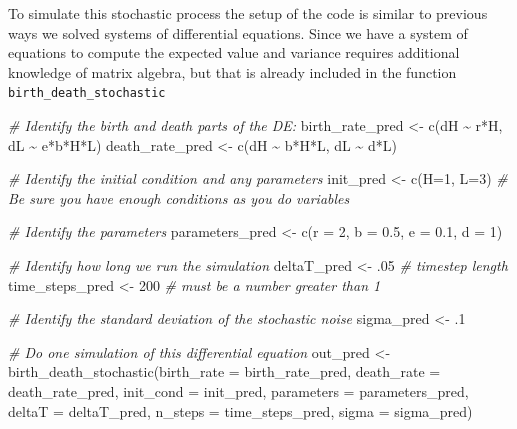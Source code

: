 \documentclass[
]{book}
\newenvironment{Shaded}{\begin{snugshade}}{\end{snugshade}}
\newcommand{\AttributeTok}[1]{\textcolor[rgb]{0.77,0.63,0.00}{#1}}
\newcommand{\CommentTok}[1]{\textcolor[rgb]{0.56,0.35,0.01}{\textit{#1}}}
\newcommand{\DecValTok}[1]{\textcolor[rgb]{0.00,0.00,0.81}{#1}}
\newcommand{\FloatTok}[1]{\textcolor[rgb]{0.00,0.00,0.81}{#1}}
\newcommand{\FunctionTok}[1]{\textcolor[rgb]{0.00,0.00,0.00}{#1}}
\newcommand{\NormalTok}[1]{#1}
\newcommand{\OtherTok}[1]{\textcolor[rgb]{0.56,0.35,0.01}{#1}}
\newcommand{\SpecialCharTok}[1]{\textcolor[rgb]{0.00,0.00,0.00}{#1}}
\theoremstyle{definition}
\theoremstyle{definition}
\theoremstyle{definition}
\theoremstyle{remark}
\begin{document}
To simulate this stochastic process the setup of the code is similar to previous ways we solved systems of differential equations. Since we have a system of equations to compute the expected value and variance requires additional knowledge of matrix algebra, but that is already included in the function \texttt{birth\_death\_stochastic}

\begin{Shaded}
\begin{Highlighting}[]
\CommentTok{\# Identify the birth and death parts of the DE:}
\NormalTok{birth\_rate\_pred }\OtherTok{\textless{}{-}} \FunctionTok{c}\NormalTok{(dH }\SpecialCharTok{\textasciitilde{}}\NormalTok{ r}\SpecialCharTok{*}\NormalTok{H, dL }\SpecialCharTok{\textasciitilde{}}\NormalTok{ e}\SpecialCharTok{*}\NormalTok{b}\SpecialCharTok{*}\NormalTok{H}\SpecialCharTok{*}\NormalTok{L)}
\NormalTok{death\_rate\_pred }\OtherTok{\textless{}{-}}  \FunctionTok{c}\NormalTok{(dH }\SpecialCharTok{\textasciitilde{}}\NormalTok{ b}\SpecialCharTok{*}\NormalTok{H}\SpecialCharTok{*}\NormalTok{L, dL }\SpecialCharTok{\textasciitilde{}}\NormalTok{ d}\SpecialCharTok{*}\NormalTok{L)}

\CommentTok{\# Identify the initial condition and any parameters}
\NormalTok{init\_pred }\OtherTok{\textless{}{-}} \FunctionTok{c}\NormalTok{(}\AttributeTok{H=}\DecValTok{1}\NormalTok{, }\AttributeTok{L=}\DecValTok{3}\NormalTok{)  }\CommentTok{\# Be sure you have enough conditions as you do variables}

\CommentTok{\# Identify the parameters}
\NormalTok{parameters\_pred }\OtherTok{\textless{}{-}} \FunctionTok{c}\NormalTok{(}\AttributeTok{r =} \DecValTok{2}\NormalTok{, }\AttributeTok{b =} \FloatTok{0.5}\NormalTok{, }\AttributeTok{e =} \FloatTok{0.1}\NormalTok{, }\AttributeTok{d =} \DecValTok{1}\NormalTok{)}

\CommentTok{\# Identify how long we run the simulation}
\NormalTok{deltaT\_pred }\OtherTok{\textless{}{-}}\NormalTok{ .}\DecValTok{05}    \CommentTok{\# timestep length}
\NormalTok{time\_steps\_pred }\OtherTok{\textless{}{-}} \DecValTok{200}   \CommentTok{\# must be a number greater than 1}

\CommentTok{\# Identify the standard deviation of the stochastic noise}
\NormalTok{sigma\_pred }\OtherTok{\textless{}{-}}\NormalTok{ .}\DecValTok{1}


\CommentTok{\# Do one simulation of this differential equation}
\NormalTok{out\_pred }\OtherTok{\textless{}{-}} \FunctionTok{birth\_death\_stochastic}\NormalTok{(}\AttributeTok{birth\_rate =}\NormalTok{ birth\_rate\_pred,}
                                       \AttributeTok{death\_rate =}\NormalTok{ death\_rate\_pred,}
                                       \AttributeTok{init\_cond =}\NormalTok{ init\_pred,}
                                       \AttributeTok{parameters =}\NormalTok{ parameters\_pred,}
                                       \AttributeTok{deltaT =}\NormalTok{ deltaT\_pred,}
                                       \AttributeTok{n\_steps =}\NormalTok{ time\_steps\_pred,}
                                       \AttributeTok{sigma =}\NormalTok{ sigma\_pred)}


\end{Highlighting}
\end{Shaded}
\end{document}
